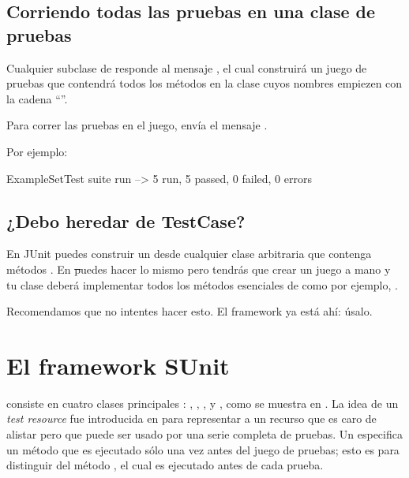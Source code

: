 \documentclass[a4paper,10pt,twoside]{book}
\begin{document}
\subsection{Corriendo todas las pruebas en una clase de pruebas}

Cualquier subclase de  responde al mensaje , el cual
construir\'a un juego de pruebas que contendr\'a todos los
m\'etodos en la clase cuyos nombres empiezen con la cadena ``''.

Para correr las pruebas en el juego, env\'ia el mensaje .

Por ejemplo:

\begin{code}{}
ExampleSetTest suite run --> 5 run, 5 passed, 0 failed, 0 errors
\end{code}

\subsection{¿Debo heredar de TestCase?}

En JUnit{} puedes construir un  desde cualquier clase arbitraria
que contenga m\'etodos . En \st puedes hacer lo mismo pero tendr\'as
que crear un juego a mano y tu clase deber\'a implementar todos los m\'etodos esenciales de 
  como por ejemplo, .

Recomendamos que no intentes hacer esto. El framework ya est\'a ah\'i: \'usalo.


\section{El framework SUnit}\label{sec:resource}

\sunit consiste en cuatro clases principales : ,
, , y , como se muestra en .
La idea de un \emph{test resource} fue introducida en  para representar a un recurso
que es caro de alistar pero que puede ser usado por una serie completa de pruebas.  Un 
especifica un m\'etodo  que es ejecutado s\'olo una vez antes del juego de pruebas;
esto es para distinguir del m\'etodo , el cual es ejecutado antes de cada prueba. 
\end{document}
